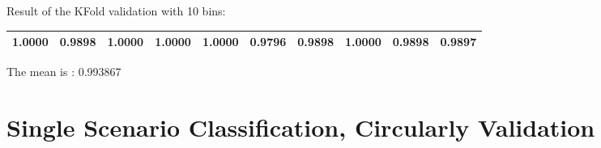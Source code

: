 Result of the KFold validation with 10 bins:
 {\def\arraystretch{1.3} 
 \begin{table}[H] 
\centering 
\begin{tabular}{|l |l |l |l |l |l |l |l |l |l |}  
\hline 
1.0000&
0.9898&
1.0000&
1.0000&
1.0000&
0.9796&
0.9898&
1.0000&
0.9898&
0.9897\\ \hline  

\end{tabular} 
\end{table} }

The mean is : 0.993867

\chapter{Single Scenario Classification, Circularly Validation}

